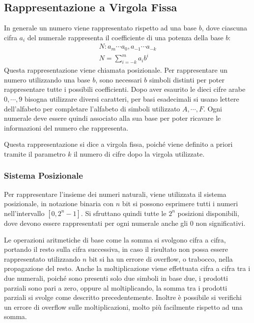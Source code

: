 \documentclass{article}
\numberwithin{equation}{subsection}
\begin{document}
\subsection{Rappresentazione a Virgola Fissa}

In generale un numero viene rappresentato rispetto ad una base $b$, dove ciascuna cifra $a_i$ del numerale rappresenta il coefficiente di una potenza della base $b$:
\begin{gather*}
    N:a_m\cdots a_0,a_{-1}\cdots a_{-k}\\
    N=\displaystyle\sum_{i=-k}^ma_ib^i
\end{gather*}
Questa rappresentazione viene chiamata posizionale. 
Per rappresentare un numero utilizzando una base $b$, sono necessari $b$ simboli distinti per poter rappresentare tutte i possibili coefficienti. Dopo aver 
esaurito le dieci cifre arabe $0,\cdots,9$ bisogna utilizzare diversi caratteri, per basi esadecimali si usano lettere dell'alfabeto per completare l'alfabeto di simboli 
utilizzato $A,\cdots,F$. 
Ogni numerale deve essere quindi associato alla sua base per poter ricavare le informazioni del numero che rappresenta.  

Questa rappresentazione si dice a virgola fissa, poiché viene definito a priori tramite il parametro $k$ il numero di cifre dopo la virgola utilizzate. 

\subsubsection{Sistema Posizionale}
Per rappresentare l'insieme dei numeri naturali, viene utilizzata il sistema posizionale, in notazione binaria con $n$ bit si possono esprimere tutti i numeri nell'intervallo 
$[0,2^n-1]$. Si sfruttano quindi tutte le $2^n$ posizioni disponibili, dove devono essere rappresentati per ogni numerale anche gli $0$ non significativi.  

Le operazioni aritmetiche di base come la somma si svolgono cifra a cifra, portando il resto sulla cifra successiva, in caso il risultato non possa essere rappresentato 
utilizzando $n$ bit si ha un errore di overflow, o trabocco, nella propagazione del resto. 
Anche la moltiplicazione viene effettuata cifra a cifra tra i due numerali, poiché sono presenti solo due simboli in base due, i prodotti parziali sono pari a zero, oppure 
al moltiplicando, la somma tra i prodotti parziali si svolge come descritto precedentemente. Inoltre è possibile si verifichi un errore di overflow sulle moltiplicazioni, 
molto più facilmente rispetto ad una somma. 
\end{document}
